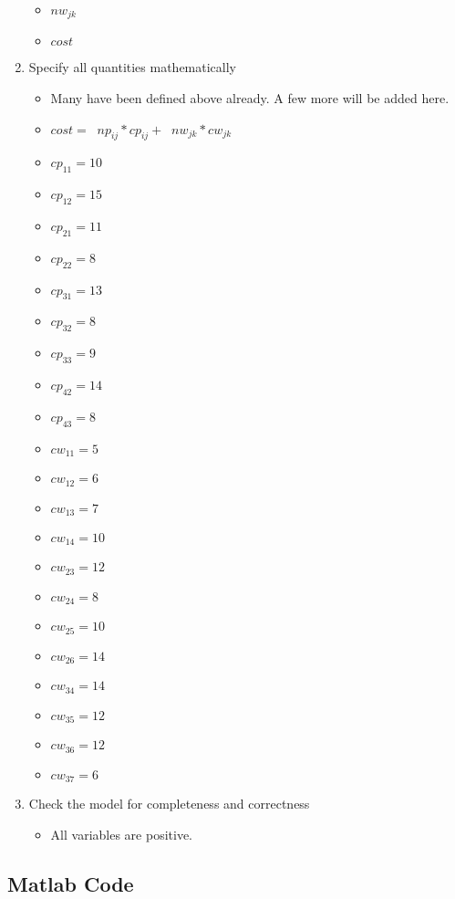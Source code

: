 \documentclass[../report/main.tex]{subfiles}
\begin{document}
\begin{enumerate}[1.]
\begin{itemize}
		\item $nw_{jk}$
		\item $cost$
	\end{itemize}
	\item Specify all quantities mathematically
	\begin{itemize}
		\item Many have been defined above already.  A few more will be added here.
		\item $cost = \mathop{\sum_{i=1}^{n}\sum_{j=1}^{q}}np_{ij}*cp_{ij} +  \mathop{\sum_{j=1}^{q}\sum_{k=1}^{m}}nw_{jk}*cw_{jk}$
		\item $cp_{11} = 10$
		\item $cp_{12} = 15$
		\item $cp_{21} = 11$
		\item $cp_{22} = 8$
		\item $cp_{31} = 13$
		\item $cp_{32} = 8$
		\item $cp_{33} = 9$
		\item $cp_{42} = 14$
		\item $cp_{43} = 8$
		\item $cw_{11} = 5$
		\item $cw_{12} = 6$
		\item $cw_{13} = 7$
		\item $cw_{14} = 10$
		\item $cw_{23} = 12$
		\item $cw_{24} = 8$
		\item $cw_{25} = 10$
		\item $cw_{26} = 14$
		\item $cw_{34} = 14$
		\item $cw_{35} = 12$
		\item $cw_{36} = 12$
		\item $cw_{37} = 6$
	\end{itemize}
	\item Check the model for completeness and correctness
	\begin{itemize}
	\item All variables are positive.
	\end{itemize}
\end{enumerate}
\subsection*{ Matlab Code}

\end{document}
